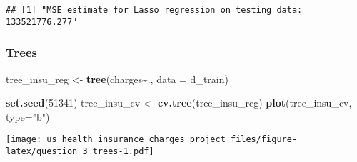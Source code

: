 \documentclass[
]{article}
\newenvironment{Shaded}{\begin{snugshade}}{\end{snugshade}}
\newcommand{\AttributeTok}[1]{\textcolor[rgb]{0.13,0.29,0.53}{#1}}
\newcommand{\DecValTok}[1]{\textcolor[rgb]{0.00,0.00,0.81}{#1}}
\newcommand{\FunctionTok}[1]{\textcolor[rgb]{0.13,0.29,0.53}{\textbf{#1}}}
\newcommand{\NormalTok}[1]{#1}
\newcommand{\OtherTok}[1]{\textcolor[rgb]{0.56,0.35,0.01}{#1}}
\newcommand{\SpecialCharTok}[1]{\textcolor[rgb]{0.81,0.36,0.00}{\textbf{#1}}}
\newcommand{\StringTok}[1]{\textcolor[rgb]{0.31,0.60,0.02}{#1}}
\begin{document}
\begin{Shaded}
\end{Shaded}

\begin{verbatim}
## [1] "MSE estimate for Lasso regression on testing data: 133521776.277"
\end{verbatim}

\hypertarget{trees}{%
\subsubsection{Trees}\label{trees}}

\begin{Shaded}
\begin{Highlighting}[]
\NormalTok{tree\_insu\_reg }\OtherTok{\textless{}{-}} \FunctionTok{tree}\NormalTok{(charges}\SpecialCharTok{\textasciitilde{}}\NormalTok{., }\AttributeTok{data =}\NormalTok{ d\_train)}

\FunctionTok{set.seed}\NormalTok{(}\DecValTok{51341}\NormalTok{)}
\NormalTok{tree\_insu\_cv }\OtherTok{\textless{}{-}} \FunctionTok{cv.tree}\NormalTok{(tree\_insu\_reg)}
\FunctionTok{plot}\NormalTok{(tree\_insu\_cv, }\AttributeTok{type=}\StringTok{"b"}\NormalTok{) }
\end{Highlighting}
\end{Shaded}

\texttt{[image: us\_health\_insurance\_charges\_project\_files/figure-latex/question\_3\_trees-1.pdf]}
\end{document}
